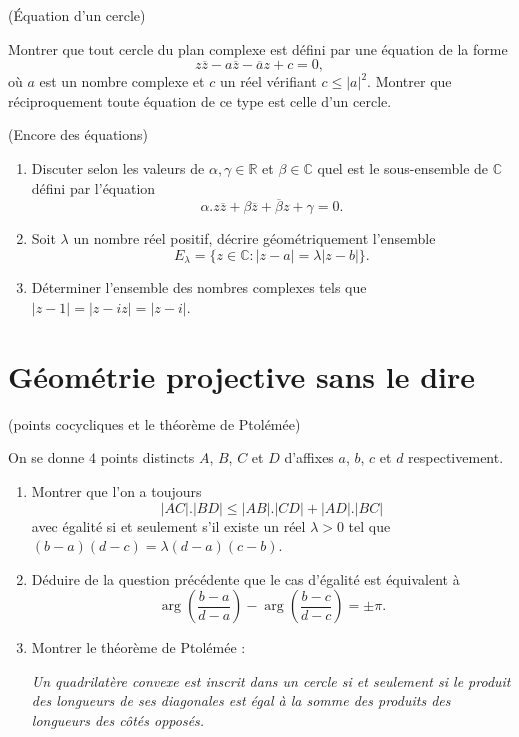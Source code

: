 \documentclass[a4paper,12pt,reqno]{amsart}
\begin{document}
\begin{exo} (Équation d'un cercle)

  Montrer que tout cercle du plan complexe est défini par une équation de la forme
    $$
      z\overline{z}-a\overline{z}-\overline{a}z+c=0,
    $$
  où $a$ est un nombre complexe et $c$ un réel vérifiant $c \leq |a|^{2}$. Montrer que réciproquement toute équation de ce type est celle d'un cercle.
\end{exo}


\begin{exo} (Encore des équations)
  \begin{enumerate}
    \item Discuter selon les valeurs de $\alpha,\gamma \in \mathbb{R}$ et $\beta \in \mathbb{C}$ quel est le sous-ensemble de $\mathbb{C}$ défini par l'équation
      $$
        \alpha.z\overline{z}+\beta\overline{z}+\overline{\beta}z+\gamma=0.
      $$
    \item Soit $\lambda$ un nombre réel positif, décrire géométriquement l'ensemble
      $$
        E_{\lambda}=\lbrace z\in\mathbb{C}:\vert z-a \vert =\lambda \vert z-b \vert \rbrace .
      $$
    \item Déterminer l'ensemble des nombres complexes tels que $\vert z-1 \vert=\vert z-i z\vert=\vert z-i \vert$.
  \end{enumerate}
\end{exo}



\section{Géométrie projective sans le dire}


\begin{exo} (points cocycliques et le théorème de Ptolémée)

  On se donne $4$ points distincts $A$, $B$, $C$ et $D$ d'affixes $a$, $b$, $c$ et $d$ respectivement.
  \begin{enumerate}
    \item Montrer que l'on a toujours
      $$
        |AC|.|BD| \leq |AB|.|CD|+|AD|.|BC|
      $$
      avec égalité si et seulement s'il existe un réel $\lambda > 0$ tel que $(b-a)(d-c)=\lambda (d-a)(c-b)$.
    \item Déduire de la question précédente que le cas d'égalité est équivalent à
      $$
        \arg(\frac{b-a}{d-a})-\arg(\frac{b-c}{d-c}) = \pm\pi.
      $$
    \item Montrer le théorème de Ptolémée :

    \textit{Un quadrilatère convexe est inscrit dans un cercle si et seulement si le produit des longueurs de ses diagonales est égal à la somme des produits des longueurs des côtés opposés.}
  \end{enumerate}
 \end{exo}
\end{document}
